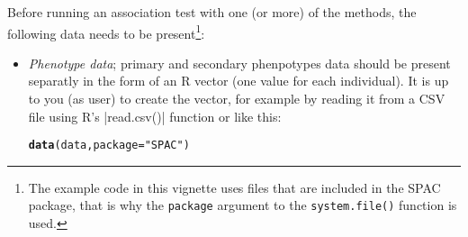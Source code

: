 \documentclass{article}\usepackage[]{graphicx}\usepackage[]{color}
\makeatletter
\newcommand{\hlstr}[1]{\textcolor[rgb]{0.192,0.494,0.8}{#1}}%
\newcommand{\hlstd}[1]{\textcolor[rgb]{0.345,0.345,0.345}{#1}}%
\newcommand{\hlkwc}[1]{\textcolor[rgb]{0.333,0.667,0.333}{#1}}%
\newcommand{\hlkwd}[1]{\textcolor[rgb]{0.737,0.353,0.396}{\textbf{#1}}}%
\newenvironment{kframe}{%
 \def\at@end@of@kframe{}%
 \ifinner\ifhmode%
  \def\at@end@of@kframe{\end{minipage}}%
  \begin{minipage}{\columnwidth}%
 \fi\fi%
 \def\FrameCommand##1{\hskip\@totalleftmargin \hskip-\fboxsep
 \colorbox{shadecolor}{##1}\hskip-\fboxsep
     \hskip-\linewidth \hskip-\@totalleftmargin \hskip\columnwidth}%
 \MakeFramed {\advance\hsize-\width
   \@totalleftmargin\z@ \linewidth\hsize
   \@setminipage}}%
 {\par\unskip\endMakeFramed%
 \at@end@of@kframe}
\newenvironment{knitrout}{}{} %
\makeatother
\begin{document}
Before running an association test with one (or more) of the methods,
the following data needs to be present\footnote{The example code in
  this vignette uses files that are included in the SPAC
  package, that is why the \lstinline{package} argument to the
  \lstinline{system.file()} function is used.}:
\begin{itemize}
\item \emph{Phenotype data}; primary and secondary phenpotypes data should be present separatly in the form of
  an R vector (one value for each individual). It is up to you (as user)
  to create the vector, for example by reading it from a CSV file using R's
  |read.csv()| function or like this:
\begin{knitrout}
\color{fgcolor}\begin{kframe}
\begin{alltt}

   \hlkwd{data}\hlstd{(data,}\hlkwc{package}\hlstd{=}\hlstr{"SPAC"}\hlstd{)}
   

\end{alltt}
\end{kframe}
\end{knitrout}
\end{itemize}
\end{document}
